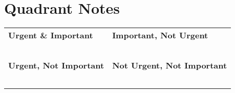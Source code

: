 \documentclass[a4paper,10pt]{article}
\begin{document}
\section*{Quadrant Notes}
\begin{tabular}{@{}L{0.45\textwidth}|L{0.45\textwidth}@{}}
    \hline
     \textbf{Urgent \& Important} &  \textbf{Important, Not Urgent} \\
    \vspace{0.9in} & \vspace{0.9in} \\
    \vspace{0.9in} & \vspace{0.9in} \\
    \vspace{0.9in} & \vspace{0.9in} \\
    \vspace{0.9in} & \vspace{0.9in} \\
    \vspace{0.9in} & \vspace{0.9in} \\
    \hline
     \textbf{Urgent, Not Important} &  \textbf{Not Urgent, Not Important} \\
    \vspace{0.9in} & \vspace{0.9in} \\
    \vspace{0.9in} & \vspace{0.9in} \\
    \vspace{0.9in} & \vspace{0.9in} \\
    \vspace{0.9in} & \vspace{0.9in} \\
    \vspace{0.9in} & \vspace{0.9in} \\
    \hline
\end{tabular}
\end{document}
